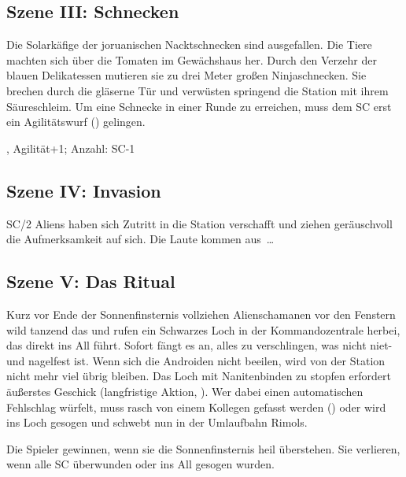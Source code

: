 {		

		\subsection{Szene III: Schnecken}

		\noindent
		Die Solarkäfige der joruanischen Nacktschnecken sind ausgefallen. Die Tiere machten sich über die Tomaten im Gewächshaus her. Durch den Verzehr der blauen Delikatessen mutieren sie zu drei Meter großen Ninjaschnecken. Sie brechen durch die gläserne Tür und verwüsten springend die Station mit ihrem Säureschleim. Um eine Schnecke in einer Runde zu erreichen, muss dem SC erst ein Agilitätswurf () gelingen.

		, Agilität+1; Anzahl: SC-1

		\subsection{Szene IV: Invasion}

		\noindent
		SC/2 Aliens haben sich Zutritt in die Station verschafft und ziehen geräuschvoll die Aufmerksamkeit auf sich. Die Laute kommen aus~\ldots


		\subsection{Szene V: Das Ritual}

		\noindent
		Kurz vor Ende der Sonnenfinsternis vollziehen Alienschamanen vor den Fenstern wild tanzend das  und rufen ein Schwarzes Loch in der Kommandozentrale herbei, das direkt ins All führt. Sofort fängt es an, alles zu verschlingen, was nicht niet- und nagelfest ist. Wenn sich die Androiden nicht beeilen, wird von der Station nicht mehr viel übrig bleiben. Das Loch mit Nanitenbinden zu stopfen erfordert äußerstes Geschick (langfristige Aktion, ). Wer dabei einen automatischen Fehlschlag würfelt, muss rasch von einem Kollegen gefasst werden () oder wird ins Loch gesogen und schwebt nun in der Umlaufbahn Rimols.


		\noindent
		Die Spieler gewinnen, wenn sie die Sonnenfinsternis heil überstehen. Sie verlieren, wenn alle SC überwunden oder ins All gesogen wurden.
}
